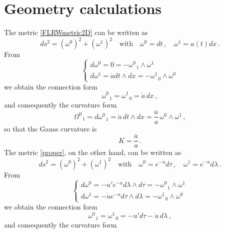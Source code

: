 \documentclass[10pt]{amsart}
\begin{document}
\section{Geometry calculations}\label{appendixA}
%
The metric \eqref{FLRWmetric2D} can be written as
\begin{equation}
ds^2 = \left(\omega^0\right)^2 + \left(\omega^1\right)^2 \quad \text{with} \quad \omega^0 = dt \, , \quad \omega^1 = a(t) dx \, .
\end{equation}
From
\begin{equation}
\begin{cases}
d\omega^0 = 0 = - \omega^0_{\,\,\,\,1} \wedge \omega^1 \\
d\omega^1 = \dot{a} dt \wedge dx = - \omega^1_{\,\,\,\,0} \wedge \omega^0
\end{cases}
\end{equation}
we obtain the connection form
\begin{equation}
\omega^0_{\,\,\,\,1} = \omega^1_{\,\,\,\,0} = \dot{a} \, dx \, ,
\end{equation}
and consequently the curvature form
\begin{equation}
\Omega^0_{\,\,\,\,1} = d\omega^0_{\,\,\,\,1} = \ddot{a} \, dt \wedge dx = \frac{\ddot{a}}{a} \, \omega^0 \wedge \omega^1\, ,
\end{equation}
so that the Gauss curvature is
\begin{equation} \label{Gausscurvature}
K =  \frac{\ddot{a}}{a} \, .
\end{equation}
The metric \eqref{proper}, on the other hand, can be written as
\begin{equation}
ds^2 = \left(\omega^0\right)^2 + \left(\omega^1\right)^2 \quad \text{with} \quad \omega^0 = e^{-u} d\tau \, , \quad \omega^1 = e^{-u} d\lambda \, .
\end{equation}
From
\begin{equation}
\begin{cases}
d\omega^0 = - u' e^{-u} d\lambda \wedge d\tau = - \omega^0_{\,\,\,\,1} \wedge \omega^1 \\
d\omega^1 = - \dot{u} e^{-u} d\tau \wedge d\lambda = - \omega^1_{\,\,\,\,0} \wedge \omega^0
\end{cases}
\end{equation}
we obtain the connection form
\begin{equation}
\omega^0_{\,\,\,\,1} = \omega^1_{\,\,\,\,0} = - u' d\tau - \dot{u} \, d\lambda \, ,
\end{equation}
and consequently the curvature form
\end{document}
